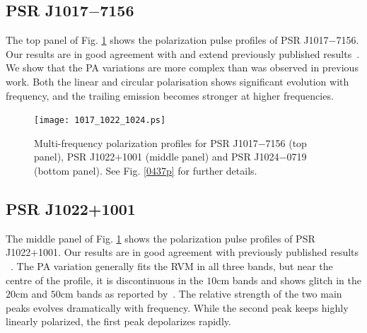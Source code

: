\documentclass[useAMS,usenatbib]{mn2e}
\begin{document}
%
%

\subsection{PSR J1017$-$7156}

The top panel of Fig. \ref{1017p} shows the polarization pulse profiles of 
PSR J1017$-$7156.
%
Our results are in good agreement with and extend previously published 
results~\citep{Keith12}. 
%
We show that the PA variations are more complex than was observed in 
previous work.
%
%
Both the linear and  circular polarisation shows significant evolution 
with frequency, and the trailing emission becomes stronger at higher 
frequencies.



\begin{figure}
\begin{center}
\texttt{[image: 1017\_1022\_1024.ps]}
\caption{Multi-frequency polarization profiles for PSR J1017$-$7156 (top 
panel), PSR J1022$+$1001 (middle panel) and PSR J1024$-$0719 (bottom panel). 
See Fig. \ref{0437p} for further details.}
\label{1017p}
\end{center}
\end{figure}

\subsection{PSR J1022+1001}

The middle panel of Fig. \ref{1017p} shows the polarization pulse profiles 
of PSR J1022+1001.
%
Our results are in good agreement with previously published results
~\citep{1022Kramer99,Stairs99,Ord04,Yan11}.
%
The PA variation generally fits the RVM in all three bands, but near the 
centre of the profile, it is discontinuous in the $10$cm bands and shows 
glitch in the $20$cm and $50$cm bands as reported by~\citet{Yan11}.
%
The relative strength of the two main peaks evolves dramatically with 
frequency.
%
While the second peak keeps highly linearly polarized, the first peak 
depolarizes rapidly.
\end{document}
